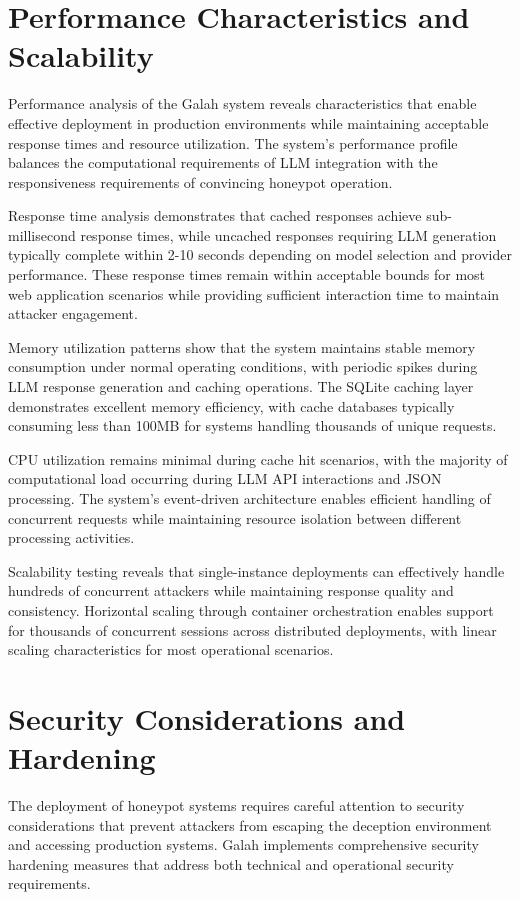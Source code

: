 \section{Performance Characteristics and Scalability}

Performance analysis of the Galah system reveals characteristics that enable effective deployment in production environments while maintaining acceptable response times and resource utilization. The system's performance profile balances the computational requirements of LLM integration with the responsiveness requirements of convincing honeypot operation.

Response time analysis demonstrates that cached responses achieve sub-millisecond response times, while uncached responses requiring LLM generation typically complete within 2-10 seconds depending on model selection and provider performance. These response times remain within acceptable bounds for most web application scenarios while providing sufficient interaction time to maintain attacker engagement.

Memory utilization patterns show that the system maintains stable memory consumption under normal operating conditions, with periodic spikes during LLM response generation and caching operations. The SQLite caching layer demonstrates excellent memory efficiency, with cache databases typically consuming less than 100MB for systems handling thousands of unique requests.

CPU utilization remains minimal during cache hit scenarios, with the majority of computational load occurring during LLM API interactions and JSON processing. The system's event-driven architecture enables efficient handling of concurrent requests while maintaining resource isolation between different processing activities.

Scalability testing reveals that single-instance deployments can effectively handle hundreds of concurrent attackers while maintaining response quality and consistency. Horizontal scaling through container orchestration enables support for thousands of concurrent sessions across distributed deployments, with linear scaling characteristics for most operational scenarios.

\section{Security Considerations and Hardening}

The deployment of honeypot systems requires careful attention to security considerations that prevent attackers from escaping the deception environment and accessing production systems. Galah implements comprehensive security hardening measures that address both technical and operational security requirements.

